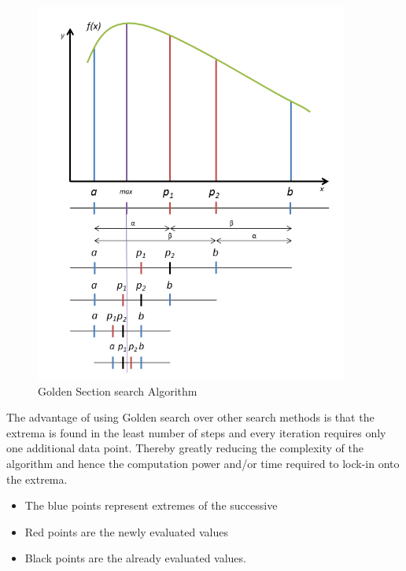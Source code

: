 { 
\begin{figure}[H]
  \begin{center}
  \includegraphics[width=0.92\textwidth]{images/Golden_search_curve}
  \caption{ Golden Section search Algorithm }
  \label{fig:Golden_search_curve}
  \end{center}
  \end{figure}
  
The advantage of using Golden search over other search methods is that the extrema is found in the least number of steps and every iteration requires only one additional data point. Thereby greatly reducing the complexity of the algorithm and hence the computation power and/or time required to lock-in onto the extrema.

\begin{itemize}
	 \item The blue points represent extremes of the successive
	 \item Red points  are the newly evaluated values
	 \item Black points are the already evaluated values.
 \end{itemize}


}
